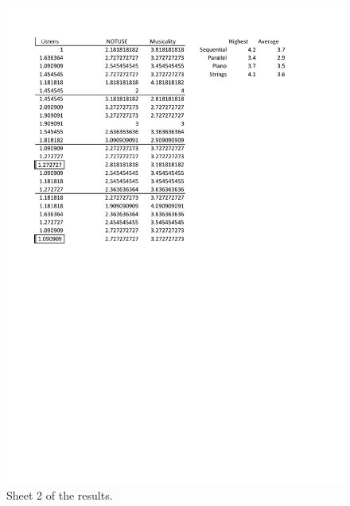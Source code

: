 \begin{figure}[ht]
\centering
\includegraphics[scale=0.75]{results2}
\caption{Sheet 2 of the results.}
\label{fig:results}
\end{figure}


